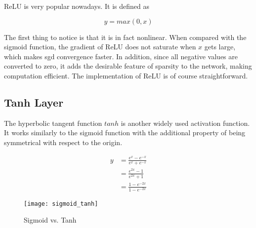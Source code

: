 ReLU is very popular nowadays. It is defined as

\begin{equation} \label{eq:relu}
  y = max(0, x)
\end{equation}

The first thing to notice is that it is in fact nonlinear. When compared with the sigmoid function, the
gradient of ReLU does not saturate when $x$ gets large, which makes \gls{sgd} convergence faster. In addition,
since all negative values are converted to zero, it adds the desirable feature of sparsity to the network,
making computation efficient. The implementation of ReLU is of course straightforward.

\subsection{Tanh Layer}

The hyperbolic tangent function $tanh$ is another widely used activation function. It works similarly to the
sigmoid function with the additional property of being symmetrical with respect to the origin.

\begin{equation} \label{eq:tanh}
  \begin{split}
    y & = \frac{e^x - e^{-x}}{e^{x} + e^{-x}} \\
      & = \frac{e^{2x} - 1}{e^{2x} + 1} \\
      & = \frac{1- e^{-2x}}{1 - e^{-2x}}
  \end{split}
\end{equation}

\begin{figure}[h]
  \centering
  \texttt{[image: sigmoid\_tanh]}
  \caption{Sigmoid vs. Tanh}
  \label{fig:sigmoid_tanh}
\end{figure}

\clearpage %
